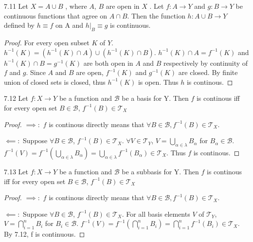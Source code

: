 \documentclass{article}
\newcommand*{\T}{\mathcal{T}}
\newcommand*{\B}{\mathcal{B}}
\begin{document}
\begin{claim}{7.11}\label{Claim 7.11.}
    Let $X = A \cup B$ , where $A$, $B$ are open in $X$ . Let $f: A \to Y$  and $g: B \to Y$ be continuous functions that agree on $A \cap B$. Then the function $h: A \cup B \to Y$ defined by $h \equiv f$ on A and $h|_{B} \equiv g$  is continuous.
\end{claim}
\begin{proof}
    For every open subset $K$ of $Y$. $h^{-1}(K) = (h^{-1}(K) \cap A) \cup (h^{-1}(K) \cap B)$. $h^{-1}(K) \cap A = f^{-1}(K)$ and $h^{-1}(K) \cap B = g^{-1}(K)$ are both open in $A$ and $B$ respectively by continuity of $f$ and $g$. Since $A$ and $B$ are open, $f^{-1}(K)$ and $g^{-1}(K)$ are closed. By finite union of closed sets is closed, thus $h^{-1}(K)$ is open. Thus $h$ is continous.                
\end{proof}

\bigskip

\begin{claim}{7.12}\label{Claim 7.12.}
    Let $f: X \to Y$ be a function and $\B$ be a basis for Y. Then $f$ is continous iff for every open set $B \in \B$, $f^{-1}(B) \in \T_X$     
\end{claim}
\begin{proof}
    $\implies:$ $f$ is continous directly means that $\forall B \in \B, f^{-1}(B) \in \T_X$. 
    
    $\impliedby:$ Suppose $\forall B \in \B$, $f^{-1}(B) \in \T_X$. $\forall V \in \T_Y$, $V = \bigcup_{\alpha \in \lambda} B_\alpha$ for $B_\alpha \in \B$. $f^{-1}(V) = f^{-1}\left(\bigcup_{\alpha \in \lambda} B_{\alpha}\right) = \bigcup_{\alpha \in \lambda} f^{-1}(B_{\alpha}) \in \T_X$. Thus $f$ is continous.          
\end{proof}

\bigskip

\begin{claim}{7.13}\label{Claim 7.13.}
    Let $f: X \to Y$ be a function and $\B$ be a subbasis for Y. Then $f$ is continous iff for every open set $B \in \B$, $f^{-1}(B) \in \T_X$     
\end{claim}
\begin{proof}
    $\implies:$ $f$ is continous directly means that $\forall B \in \B, f^{-1}(B) \in \T_X$. 
    
    $\impliedby:$ Suppose $\forall B \in \B$, $f^{-1}(B) \in \T_X$. For all basis elements $V$  of $\T_Y$, $V = \bigcap_{i = 1}^n B_{i}$ for $B_i \in \B$. $f^{-1}(V) = f^{-1}(\bigcap_{i = 1}^n B_i)= \bigcap_{i = 1}^n f^{-1}(B_i) \in \T_X$. By 7.12, f is continuous.              
\end{proof}
\end{document}
